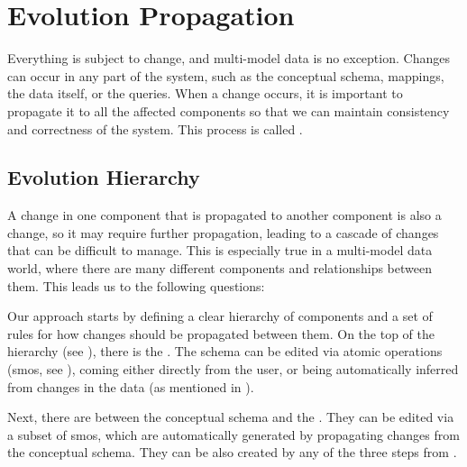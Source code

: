 \section{Evolution Propagation}
\label{sec:sec}

Everything is subject to change, and multi-model data is no exception. Changes can occur in any part of the system, such as the conceptual schema, mappings, the data itself, or the queries. When a change occurs, it is important to propagate it to all the affected components so that we can maintain consistency and correctness of the system. This process is called .


\subsection{Evolution Hierarchy}

A change in one component that is propagated to another component is also a change, so it may require further propagation, leading to a cascade of changes that can be difficult to manage. This is especially true in a multi-model data world, where there are many different components and relationships between them. This leads us to the following questions:



Our approach starts by defining a clear hierarchy of components and a set of rules for how changes should be propagated between them. On the top of the hierarchy (see ), there is the . The schema can be edited via atomic operations (\acrshort{smo}s, see ), coming either directly from the user, or being automatically inferred from changes in the data (as mentioned in ).

Next, there are  between the conceptual schema and the . They can be edited via a subset of \acrshort{smo}s, which are automatically generated by propagating changes from the conceptual schema. They can be also created by any of the three steps from .


